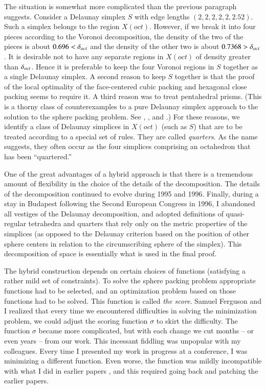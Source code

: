 The situation is somewhat more complicated than the previous
paragraph suggests. Consider a Delaunay simplex $S$ with edge
lengths $(2,2,2,2,2,2.52)$. Such a simplex belongs to the region
$X(oct)$. However, if we break it into four pieces according to
the Voronoi decomposition, the density of the two of the pieces is
about $0.696<\delta_{oct}$ and the density of the other two is about
$0.7368>\delta_{oct}$. It is desirable not to have any separate regions
in $X(oct)$ of density greater than $\delta_{oct}$.  Hence it is
preferable to keep the four Voronoi regions in $S$ together as a
single Delaunay simplex.  A second reason to keep $S$ together is
that the proof of the local optimality of the face-centered cubic
packing and hexagonal close packing seems to require it.  A third
reason was to treat pentahedral prisms.  (This is a thorny class
of counterexamples to a pure Delaunay simplex approach to the
solution to the sphere packing problem.  See \cite{spp}, \cite{remarks},
and \cite{Fer97}.)  For these reasons, we identify a class of
Delaunay simplices in $X(oct)$ (such as $S$) that are to be
treated according to a special set of rules. They are called {\it
quarters}.  As the name suggests, they often occur as the four
simplices comprising an octahedron that has been ``quartered.''

One of the great advantages of a hybrid approach is that there is
a tremendous amount of flexibility in the choice of the details of
the decomposition.  The details of the decomposition continued to
evolve during 1995 and 1996.  Finally, during a stay in Budapest
following the Second European Congress in 1996, I abandoned all
vestiges of the Delaunay decomposition, and adopted definitions of
quasi-regular tetrahedra and quarters that rely only on the metric
properties of the simplices (as opposed to the Delaunay criterion
based on the position of other sphere centers in relation to the
circumscribing sphere of the simplex).  This decomposition of
space is essentially what is used in the final proof.

The hybrid construction depends on certain choices of functions
(satisfying a rather mild set of constraints).  To solve the
sphere packing problem appropriate functions had to be selected, and an
optimization problem based on those functions had to be solved.
This function is called {\it the score}.  Samuel Ferguson and I
realized that every time we encountered difficulties in solving
the minimization problem, we could adjust the scoring function
$\sigma$ to skirt the difficulty.  The function $\sigma$ became
more complicated, but with each change we cut months -- or even
years -- from our work.  This incessant fiddling was unpopular
with my colleagues.  Every time I presented my work in progress at
a conference, I was minimizing a different function.  Even worse,
the function was mildly incompatible with what I did in earlier
papers \cite{part1} \cite{part2}, and this required going back and
patching the earlier papers.

